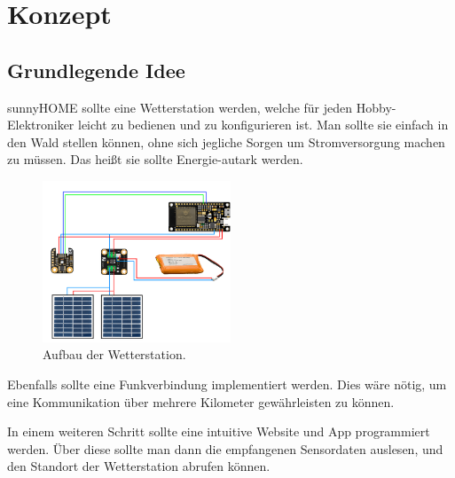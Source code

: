 

\chapter{Konzept}

    \section{Grundlegende Idee}\label{ref:Konzept}
    
        sunnyHOME sollte eine Wetterstation werden, welche für jeden Hobby-Elektroniker leicht zu bedienen und zu konfigurieren ist. Man sollte sie einfach in den Wald stellen können, ohne sich jegliche Sorgen um Stromversorgung machen zu müssen. Das heißt sie sollte Energie-autark werden. 
        
        \begin{figure}[H]
            \centering
            \includegraphics[width=0.5\textwidth]{./media/images/Schema.png}
            \caption{Aufbau der Wetterstation.\cite{bib:HugoGomes}}
            \label{fig:Aufbau}
        \end{figure}
        
        Ebenfalls sollte eine Funkverbindung implementiert werden. Dies wäre nötig, um eine Kommunikation über mehrere Kilometer gewährleisten zu können. 
        
        In einem weiteren Schritt sollte eine intuitive Website und App programmiert werden. Über diese sollte man dann die empfangenen Sensordaten auslesen, und den Standort der Wetterstation abrufen können. 
        
